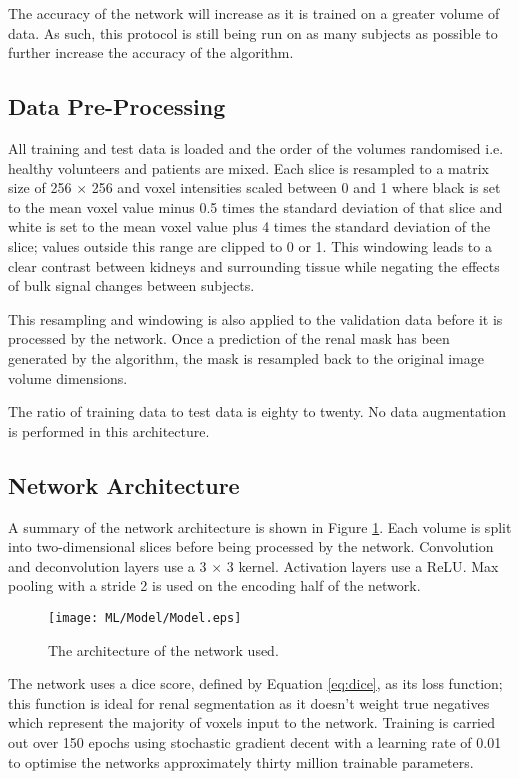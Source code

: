 The accuracy of the network will increase as it is trained on a greater volume of data. As such, this protocol is still being run on as many subjects as possible to further increase the accuracy of the algorithm.

\subsection{Data Pre-Processing}
All training and test data is loaded and the order of the volumes randomised i.e. healthy volunteers and patients are mixed. Each slice is resampled to a matrix size of 256 $\times$ 256 and voxel intensities scaled between 0 and 1 where black is set to the mean voxel value minus 0.5 times the standard deviation of that slice and white is set to the mean voxel value plus 4 times the standard deviation of the slice; values outside this range are clipped to 0 or 1. This windowing leads to a clear contrast between kidneys and surrounding tissue while negating the effects of bulk signal changes between subjects.

This resampling and windowing is also applied to the validation data before it is processed by the network. Once a prediction of the renal mask has been generated by the algorithm, the mask is resampled back to the original image volume dimensions.

The ratio of training data to test data is eighty to twenty. No data augmentation is performed in this architecture.

\subsection{Network Architecture}

A summary of the network architecture is shown in Figure \ref{fig:ml_network}. Each volume is split into two-dimensional slices before being processed by the network. Convolution and deconvolution layers use a 3 $\times$ 3 kernel. Activation layers use a \ac{ReLU}. Max pooling with a stride 2 is used on the encoding half of the network.

\begin{figure}[h]
	\centering
	\texttt{[image: ML/Model/Model.eps]}
	\caption{The architecture of the network used.}
	\label{fig:ml_network}	
\end{figure}

The network uses a dice score, defined by Equation \eqref{eq:dice}, as its loss function; this function is ideal for renal segmentation as it doesn't weight true negatives which represent the majority of voxels input to the network. Training is carried out over 150 epochs using stochastic gradient decent with a learning rate of 0.01 to optimise the networks approximately thirty million trainable parameters.

